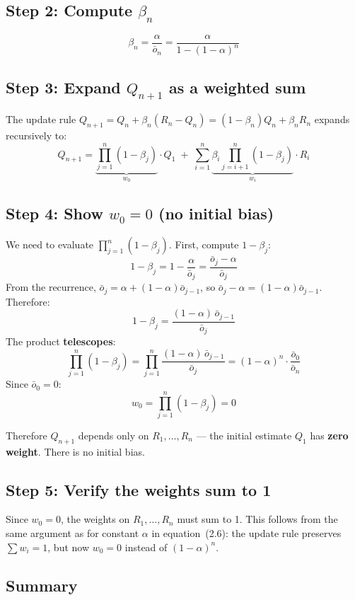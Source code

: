 \documentclass[11pt]{article}
\begin{document}
\subsection*{Step 2: Compute $\beta_n$}

\[
    \beta_n = \frac{\alpha}{\bar{o}_n} = \frac{\alpha}{1 - (1-\alpha)^n}
\]

\subsection*{Step 3: Expand $Q_{n+1}$ as a weighted sum}

The update rule $Q_{n+1} = Q_n + \beta_n(R_n - Q_n) = (1 - \beta_n)Q_n + \beta_n R_n$
expands recursively to:
\[
    Q_{n+1} = \underbrace{\prod_{j=1}^{n}(1-\beta_j)}_{w_0} \cdot Q_1
    \;+\; \sum_{i=1}^{n} \underbrace{\beta_i \prod_{j=i+1}^{n}(1-\beta_j)}_{w_i} \cdot R_i
\]

\subsection*{Step 4: Show $w_0 = 0$ (no initial bias)}

We need to evaluate $\prod_{j=1}^{n}(1-\beta_j)$. First, compute $1 - \beta_j$:
\[
    1 - \beta_j = 1 - \frac{\alpha}{\bar{o}_j} = \frac{\bar{o}_j - \alpha}{\bar{o}_j}
\]
From the recurrence, $\bar{o}_j = \alpha + (1-\alpha)\bar{o}_{j-1}$, so
$\bar{o}_j - \alpha = (1-\alpha)\bar{o}_{j-1}$. Therefore:
\[
    1 - \beta_j = \frac{(1-\alpha)\,\bar{o}_{j-1}}{\bar{o}_j}
\]
The product \textbf{telescopes}:
\[
    \prod_{j=1}^{n}(1-\beta_j)
    = \prod_{j=1}^{n} \frac{(1-\alpha)\,\bar{o}_{j-1}}{\bar{o}_j}
    = (1-\alpha)^n \cdot \frac{\bar{o}_0}{\bar{o}_n}
\]
Since $\bar{o}_0 = 0$:
\[
    \boxed{w_0 = \prod_{j=1}^{n}(1-\beta_j) = 0}
\]

Therefore $Q_{n+1}$ depends only on $R_1, \ldots, R_n$ --- the initial estimate $Q_1$
has \textbf{zero weight}. There is no initial bias.

\subsection*{Step 5: Verify the weights sum to 1}

Since $w_0 = 0$, the weights on $R_1, \ldots, R_n$ must sum to 1.
This follows from the same argument as for constant $\alpha$ in equation~(2.6):
the update rule preserves $\sum w_i = 1$, but now $w_0 = 0$ instead of $(1-\alpha)^n$.

\subsection*{Summary}
\end{document}
